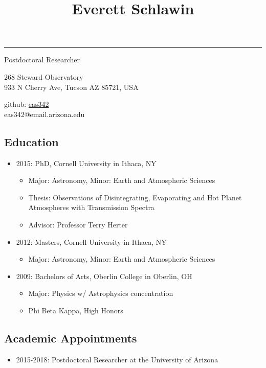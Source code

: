 \documentclass[11pt, oneside]{article}   	%
\title{Everett Schlawin}
\date{}							%
\begin{document}
\maketitle
\vspace{-0.85in}
\begin{centering}
\rule{6in}{0.03in}
Postdoctoral Researcher

268 Steward Observatory\\
933 N Cherry Ave, Tucson AZ 85721, USA

github: \href{https://github.com/eas342}{eas342}\\
eas342@email.arizona.edu

\end{centering}

\subsection*{Education}
\begin{itemize}[noitemsep]
	\item 2015: PhD, Cornell University in Ithaca, NY
		\begin{itemize}[noitemsep]
		\item Major: Astronomy, Minor: Earth and Atmospheric Sciences
		\item Thesis: Observations of Disintegrating, Evaporating and Hot Planet Atmospheres with Transmission Spectra
		\item Advisor: Professor Terry Herter
		\end{itemize}
	\item 2012: Masters, Cornell University in Ithaca, NY
		\begin{itemize}[noitemsep]
		\item Major: Astronomy, Minor: Earth and Atmospheric Sciences
		\end{itemize}
	\item 2009: Bachelors of Arts, Oberlin College in Oberlin, OH
		\begin{itemize}[noitemsep]
		\item Major: Physics w/ Astrophysics concentration
		\item Phi Beta Kappa, High Honors
		\end{itemize}
\end{itemize}

\subsection*{Academic Appointments}
\begin{itemize}[noitemsep]
	\item 2015-2018: Postdoctoral Researcher at the University of Arizona
\end{itemize}
\end{document}
